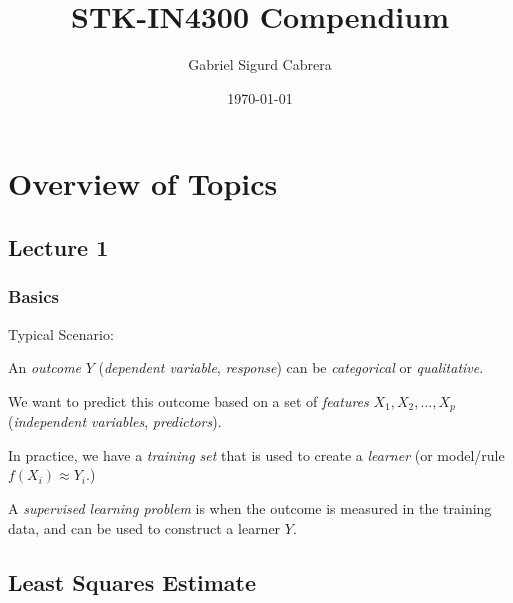 \documentclass[twoside,twocolumn,10pt]{revtex4-1}
\begin{document}
	
	\title{STK-IN4300 Compendium}
	\author{Gabriel Sigurd Cabrera}
	\date{\today}
	
	
	
	
	\fancyhf{} 
	\fancyhead[L]{\rightmark}
	\fancyfoot[C]{\thepage}
	
	\maketitle
	\twocolumngrid
	
	\section{Overview of Topics}
	
	\subsection{Lecture 1}	
	
	\subsubsection{Basics}
	
	Typical Scenario:
	
	An \textit{outcome} $Y$ (\textit{dependent variable}, \textit{response}) can be \textit{categorical} or \textit{qualitative}.
	
	We want to predict this outcome based on a set of \textit{features} $X_1, X_2, ..., X_p$ (\textit{independent variables}, \textit{predictors}).
	
	In practice, we have a \textit{training set} that is used to create a \textit{learner} (or model/rule $f(X_i) \approx Y_i$.)
	
	A \textit{supervised learning problem} is when the outcome is measured in the training data, and can be used to construct a learner $Y$.
	
	\subsection{Least Squares Estimate}	
	
\end{document}
